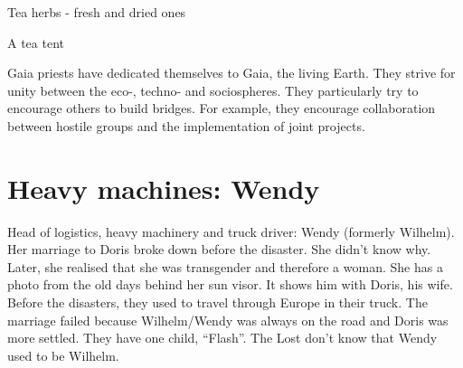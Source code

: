 \begin{npcBox}[title=Laura, Gaianistin]
    \begin{stressSection}
    \end{stressSection}
    \begin{tabularx}{\textwidth}{ XX }
    \end{tabularx}

    \begin{consequences}
    \item {}
    \item {}
    \item {}
    \end{consequences}

    \begin{equipment}
    \item Tea herbs - fresh and dried ones
    \item A tea tent
    \end{equipment}
\end{npcBox}


Gaia priests have dedicated themselves to Gaia, the living Earth. They strive for unity between the eco-, techno- and sociospheres. They particularly try to encourage others to build bridges. For example, they encourage collaboration between hostile groups and the implementation of joint projects.

\newpage


\section{Heavy machines: Wendy}

Head of logistics, heavy machinery and truck driver: Wendy (formerly Wilhelm). Her marriage to Doris broke down before the disaster. She didn't know why. Later, she realised that she was transgender and therefore a woman. She has a photo from the old days behind her sun visor. It shows him with Doris, his wife. Before the disasters, they used to travel through Europe in their truck. The marriage failed because Wilhelm/Wendy was always on the road and Doris was more settled. They have one child, “Flash”. The Lost don't know that Wendy used to be Wilhelm.

